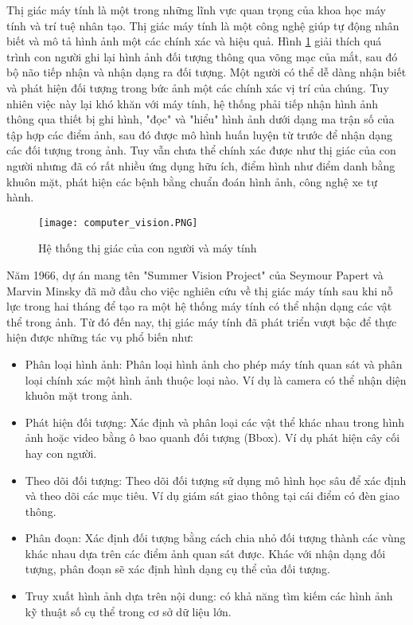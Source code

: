 \documentclass[../the.tex]{subfiles}
\begin{document}
{\fontsize{13}{12}\selectfont
	Thị giác máy tính là một trong những lĩnh vực quan trọng của khoa học máy tính và trí tuệ nhân tạo. Thị giác máy tính là một công nghệ giúp tự động nhân biết và mô tả hình ảnh một các chính xác và hiệu quả.
	Hình \ref{fig:computer_vision} giải thích quá trình con người ghi lại hình ảnh đối tượng thông qua võng mạc của mắt,
	sau đó bộ não tiếp nhận và nhận dạng ra đối tượng. Một người có thể dễ dàng nhận biết và phát hiện đối tượng trong bức ảnh một các chính xác vị trí của chúng.
	Tuy nhiên việc này lại khó khăn với máy tính, hệ thống phải
	tiếp nhận hình ảnh thông qua thiết bị ghi hình, "đọc" và "hiểu" hình ảnh dưới dạng ma trận số của tập hợp các điểm ảnh,
	sau đó được mô hình huấn luyện từ trước để nhận dạng các đối tượng trong ảnh.
	Tuy vẫn chưa thể chính xác được như thị giác của con người nhưng đã có rất nhiều ứng dụng hữu ích, điểm hình như điểm danh bằng khuôn mặt, phát hiện các bệnh bằng chuẩn đoán hình ảnh, công nghệ xe tự hành.

	\begin{figure}[H]
		\centering
		\texttt{[image: computer\_vision.PNG]}
		\caption{Hệ thống thị giác của con người và máy tính}
		\label{fig:computer_vision}
	\end{figure}}

{\fontsize{13}{12} \selectfont
	Năm 1966, dự án mang tên "Summer Vision Project" \cite{Papert1966TheSV} của Seymour Papert và Marvin Minsky  đã mở đầu cho việc nghiên cứu về thị giác máy tính sau khi nỗ lực trong hai tháng để tạo ra một hệ thống máy tính có thể
	nhận dạng các vật thể trong ảnh. Từ đó đến nay, thị giác máy tính đã phát triển vượt bậc để thực hiện được những tác vụ phổ biến như:

	\begin{itemize}
		\item Phân loại hình ảnh: Phân loại hình ảnh cho phép máy tính quan sát và phân loại chính xác một hình ảnh thuộc loại nào.
		      Ví dụ là camera có thể nhận diện khuôn mặt trong ảnh.
		\item Phát hiện đối tượng: Xác định và phân loại các vật thể khác nhau trong hình ảnh hoặc video bằng ô bao quanh đối tượng (Bbox). Ví dụ phát hiện cây cối hay con người.
		\item Theo dõi đối tượng: Theo dõi đối tượng sử dụng mô hình học sâu để xác định và theo dõi các mục tiêu. Ví dụ giám sát giao thông tại cái điểm có đèn giao thông.
		\item Phân đoạn: Xác định đối tượng bằng cách chia nhỏ đối tượng thành các vùng khác nhau dựa trên các điểm ảnh quan sát được. Khác với nhận dạng đối tượng, phân đoạn sẽ xác định hình dạng cụ thể của đối tượng.
		\item Truy xuất hình ảnh dựa trên nội dung: có khả năng tìm kiếm các hình ảnh kỹ thuật số cụ thể trong cơ sở dữ liệu lớn.
	\end{itemize}
}
\end{document}
